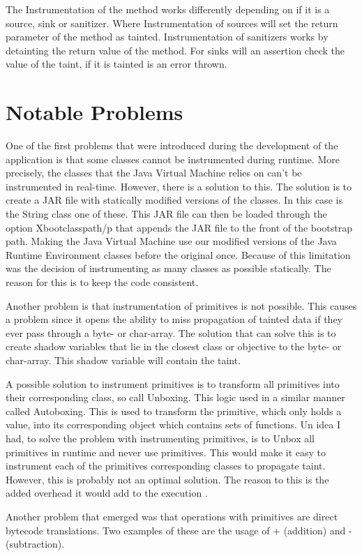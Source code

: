 The Instrumentation of the method works differently depending on if it is a source, sink or sanitizer. Where Instrumentation of sources will set the return parameter of the method as tainted. Instrumentation of sanitizers works by detainting the return value of the method. For sinks will an assertion check the value of the taint, if it is tainted is an error thrown.



\section{Notable Problems}
\label{NotableProblems}
One of the first problems that were introduced during the development of the application is that some classes cannot be instrumented during runtime. More precisely, the classes that the Java Virtual Machine relies on can't be instrumented in real-time. However, there is a solution to this. The solution is to create a JAR file with statically modified versions of the classes. In this case is the String class one of these. This JAR file can then be loaded through the option Xbootclasspath/p that appends the JAR file to the front of the bootstrap path. Making the Java Virtual Machine use our modified versions of the Java Runtime Environment classes \parencite{xboot} before the original once. Because of this limitation was the decision of instrumenting as many classes as possible statically. The reason for this is to keep the code consistent.

Another problem is that instrumentation of primitives is not possible. This causes a problem since it opens the ability to miss propagation of tainted data if they ever pass through a byte- or char-array. The solution that can solve this is to create shadow variables that lie in the closest class or objective to the byte- or char-array. This shadow variable will contain the taint.

A possible solution to instrument primitives is to transform all primitives into their corresponding class, so call Unboxing. This logic used in a similar manner called Autoboxing. This is used to transform the primitive, which only holds a value, into its corresponding object which contains sets of functions. Un idea I had, to solve the problem with instrumenting primitives, is to Unbox all primitives in runtime and never use primitives. This would make it easy to instrument each of the primitives corresponding classes to propagate taint. However, this is probably not an optimal solution. The reason to this is the added overhead it would add to the execution \parencite{BlochJoshua2008EJ}. 

Another problem that emerged was that operations with primitives are direct bytecode translations. Two examples of these are the usage of + (addition) and - (subtraction).
